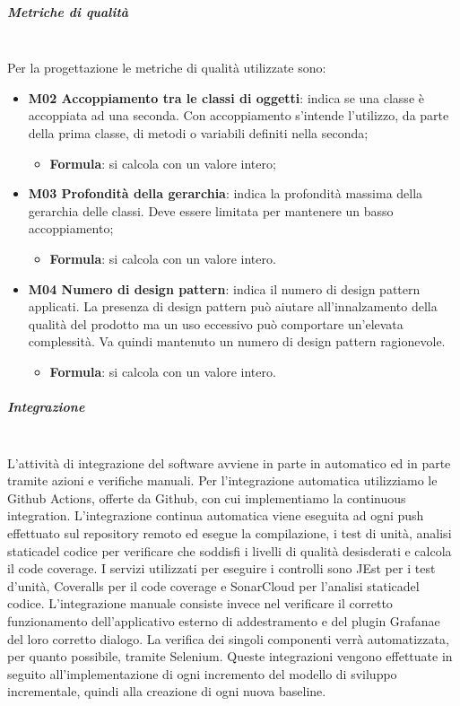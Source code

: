 \subparagraph{Metriche di qualità} \mbox{} \\
Per la progettazione le metriche di qualità utilizzate sono:
\begin{itemize}
	\item \textbf{M02 Accoppiamento tra le classi di oggetti}: indica se una classe è accoppiata ad una seconda. Con accoppiamento s'intende l'utilizzo, da parte della prima classe, di metodi o variabili definiti nella seconda; 
	\begin{itemize}
		\item[] \textbf{Formula}: si calcola con un valore intero;
	\end{itemize}
	\item \textbf{M03 Profondità della gerarchia}: indica la profondità massima della gerarchia delle classi. Deve essere limitata per mantenere un basso accoppiamento;
	\begin{itemize}
		\item[] \textbf{Formula}: si calcola con un valore intero.
	\end{itemize} 	
	\item \textbf{M04 Numero di design pattern}: indica il numero di design pattern applicati. La presenza di design pattern può aiutare all'innalzamento della qualità del prodotto ma un uso eccessivo può comportare un'elevata complessità. Va quindi mantenuto un numero di design pattern ragionevole.
	\begin{itemize}
		\item[] \textbf{Formula}: si calcola con un valore intero.
	\end{itemize} 	
\end{itemize}

\subparagraph{Integrazione} \mbox{} \\
L'attività di integrazione del software avviene in parte in automatico ed in parte tramite azioni e verifiche manuali.
\newline
Per l'integrazione automatica utilizziamo le Github Actions, offerte da Github, con cui implementiamo la continuous integration. L'integrazione continua automatica viene eseguita ad ogni push effettuato sul repository remoto ed esegue la compilazione, i test di unità, analisi statica\glosp del codice per verificare che soddisfi i livelli di qualità desisderati e calcola il code coverage. I servizi utilizzati per eseguire i controlli sono JEst per i test d'unità, Coveralls per il code coverage e SonarCloud per l'analisi statica\glosp del codice.
\newline
L'integrazione manuale consiste invece nel verificare il corretto funzionamento dell'applicativo esterno di addestramento e del plugin Grafana\glosp e del loro corretto dialogo. La verifica dei singoli componenti verrà automatizzata, per quanto possibile, tramite Selenium\glosp. Queste integrazioni vengono effettuate in seguito all'implementazione di ogni incremento del modello di sviluppo incrementale, quindi alla creazione di ogni nuova baseline\glo.

